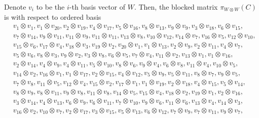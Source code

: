 \documentclass[pdftex]{sigma}
\numberwithin{equation}{section}
\theoremstyle{definition}
\begin{document}
Denote $v_i$ to be the $i$-th basis vector of $W$. Then, the blocked matrix $\pi_{W \otimes W}(C)$ is with respect to ordered basis \label{appendix-basisWxW}
\begin{align*}
 &v_{1} \otimes v_{1},
v_{1} \otimes v_{20},
v_{2} \otimes v_{19},
v_{4} \otimes v_{17},
v_{5} \otimes v_{16},
v_{8} \otimes v_{13},
v_{9} \otimes v_{9},
v_{3} \otimes v_{18},
v_{6} \otimes v_{15}, \\
&v_{7} \otimes v_{14},
v_{9} \otimes v_{11},
v_{11} \otimes v_{9},
v_{11} \otimes v_{11},
v_{13} \otimes v_{8},
v_{10} \otimes v_{12},
v_{14} \otimes v_{7},
v_{16} \otimes v_{5},
v_{12} \otimes v_{10}, \\
&v_{15} \otimes v_{6},
v_{17} \otimes v_{4},
v_{18} \otimes v_{3},
v_{19} \otimes v_{2},
v_{20} \otimes v_{1},
v_{1} \otimes v_{13},
v_{2} \otimes v_{9},
v_{2} \otimes v_{11},
v_{4} \otimes v_{7}, \\
&v_{5} \otimes v_{6},
v_{8} \otimes v_{3},
v_{9} \otimes v_{2},
v_{3} \otimes v_{8},
v_{6} \otimes v_{5},
v_{7} \otimes v_{4},
v_{11} \otimes v_{2},
v_{13} \otimes v_{1},
v_{1} \otimes v_{16}, \\
&v_{2} \otimes v_{14},
v_{4} \otimes v_{9},
v_{4} \otimes v_{11},
v_{5} \otimes v_{10},
v_{8} \otimes v_{6},
v_{9} \otimes v_{4},
v_{6} \otimes v_{8},
v_{11} \otimes v_{4},
v_{10} \otimes v_{5}, \\
&v_{14} \otimes v_{2},
v_{16} \otimes v_{1},
v_{1} \otimes v_{17},
v_{2} \otimes v_{15},
v_{4} \otimes v_{12},
v_{5} \otimes v_{9},
v_{5} \otimes v_{11},
v_{8} \otimes v_{7},
v_{9} \otimes v_{5}, \\
&v_{7} \otimes v_{8},
v_{11} \otimes v_{5},
v_{12} \otimes v_{4},
v_{15} \otimes v_{2},
v_{17} \otimes v_{1},
v_{1} \otimes v_{19},
v_{2} \otimes v_{18},
v_{4} \otimes v_{15},
v_{5} \otimes v_{14}, \\
&v_{8} \otimes v_{9},
v_{8} \otimes v_{11},
v_{9} \otimes v_{8},
v_{11} \otimes v_{8},
v_{14} \otimes v_{5},
v_{15} \otimes v_{4},
v_{18} \otimes v_{2},
v_{19} \otimes v_{1},
v_{2} \otimes v_{16}, \\
&v_{3} \otimes v_{14},
v_{4} \otimes v_{13},
v_{6} \otimes v_{9},
v_{6} \otimes v_{11},
v_{7} \otimes v_{10},
v_{9} \otimes v_{6},
v_{11} \otimes v_{6},
v_{13} \otimes v_{4},
v_{14} \otimes v_{3}, \\
&v_{16} \otimes v_{2},
v_{10} \otimes v_{7},
v_{2} \otimes v_{17},
v_{3} \otimes v_{15},
v_{5} \otimes v_{13},
v_{6} \otimes v_{12},
v_{7} \otimes v_{9},
v_{7} \otimes v_{11},
v_{9} \otimes v_{7}, \\

\end{align*}
\end{document}
